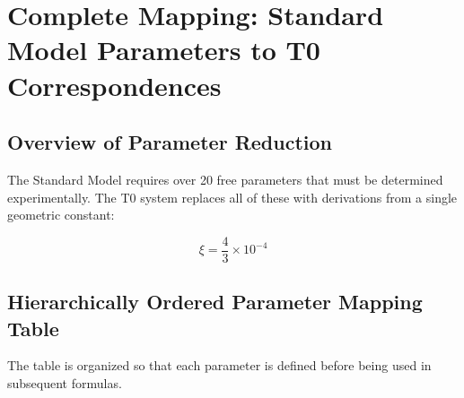\documentclass[12pt,a4paper]{article}
\begin{document}
\section{Complete Mapping: Standard Model Parameters to T0 Correspondences}
\label{sec:sm_t0_mapping}

\subsection{Overview of Parameter Reduction}
\label{subsec:parameter_overview}

The Standard Model requires over 20 free parameters that must be determined experimentally. The T0 system replaces all of these with derivations from a single geometric constant:

\begin{equation}
	\boxed{\xi = \frac{4}{3} \times 10^{-4}}
\end{equation}

\subsection{Hierarchically Ordered Parameter Mapping Table}
\label{subsec:hierarchical_mapping}

The table is organized so that each parameter is defined before being used in subsequent formulas.
\end{document}
